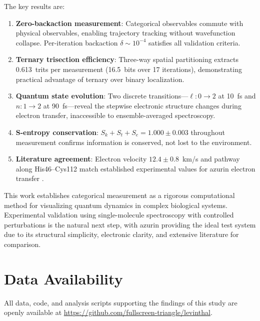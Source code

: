 \documentclass[twocolumn,10pt]{article}
\begin{document}
The key results are:

\begin{enumerate}
\item \textbf{Zero-backaction measurement}: Categorical observables commute
with physical observables, enabling trajectory tracking without wavefunction
collapse. Per-iteration backaction $\delta \sim 10^{-4}$ satisfies all
validation criteria.

\item \textbf{Ternary trisection efficiency}: Three-way spatial partitioning
extracts 0.613~trits per measurement (16.5~bits over 17 iterations),
demonstrating practical advantage of ternary over binary localization.

\item \textbf{Quantum state evolution}: Two discrete transitions---$\ell: 0 \to 2$
at 10~fs and $n: 1 \to 2$ at 90~fs---reveal the stepwise electronic structure
changes during electron transfer, inaccessible to ensemble-averaged spectroscopy.

\item \textbf{S-entropy conservation}: $S_k + S_t + S_e = 1.000 \pm 0.003$
throughout measurement confirms information is conserved, not lost to the
environment.

\item \textbf{Literature agreement}: Electron velocity $12.4 \pm 0.8$~km/s
and pathway along His46--Cys112 match established experimental values for
azurin electron transfer \cite{Gray2003, Crane2001, Beratan1992}.
\end{enumerate}

This work establishes categorical measurement as a rigorous computational
method for visualizing quantum dynamics in complex biological systems.
Experimental validation using single-molecule spectroscopy with controlled
perturbations is the natural next step, with azurin providing the ideal
test system due to its structural simplicity, electronic clarity, and
extensive literature for comparison.

\section*{Data Availability}

All data, code, and analysis scripts supporting the findings of this study
are openly available at
\url{https://github.com/fullscreen-triangle/levinthal}.
\end{document}

